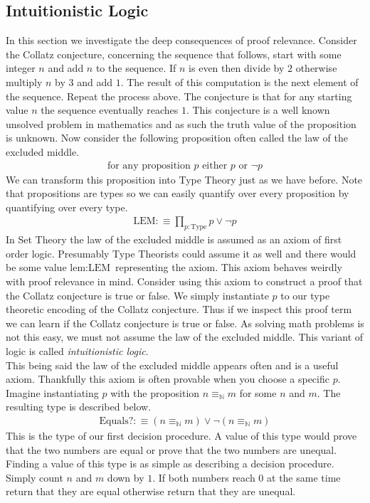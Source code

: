 \documentclass[./Thesis.tex]{subfiles}
\begin{document}
\subsection{Intuitionistic Logic}
In this section we investigate the deep consequences of proof relevance.
Consider the Collatz conjecture, concerning the sequence that follows, start with some
integer $n$ and add $n$ to the sequence. If $n$ is even then divide by $2$
otherwise multiply $n$ by $3$ and add $1$. The result of this computation is the
next element of the sequence. Repeat the process above. The conjecture is
that for any starting value $n$ the sequence eventually reaches $1$. This
conjecture is a well known unsolved problem in mathematics and as such the truth
value of the proposition is unknown. Now consider the following proposition
often called the law of the excluded middle.
\begin{align}
  \label{eqn:set-LEM}
  \text{for any proposition } p \text{ either } p \text{ or } \neg p
\end{align}
We can transform this proposition into Type Theory just as we have before. Note
that propositions are types so we can easily quantify over every proposition by
quantifying over every type.
\begin{align}
  \label{eqn:type-LEM}
  \text{LEM} :\equiv \prod_{p  : \text{Type}} p \vee \neg p
\end{align}
In Set Theory the law of the excluded middle is assumed as an axiom of first
order logic. Presumably Type Theorists could assume it as well and there would
be some value $\text{lem} : \text{LEM}$ representing the axiom. This axiom behaves weirdly
with proof relevance in mind. Consider using this axiom to construct a proof
that the Collatz conjecture is true or false. We simply instantiate $p$ to our
type theoretic encoding of the Collatz conjecture. Thus if we inspect this proof
term we can learn if the Collatz conjecture is true or false. As solving math
problems is not this easy, we must not assume the law of the excluded middle.
This variant of logic is called \textit{intuitionistic logic}. \\

This being said the law of the excluded middle appears often
and is a useful axiom. Thankfully this axiom is often provable when you choose a
specific $p$. Imagine instantiating $p$ with the proposition
$n \equiv_{\mathbb{N}} m$ for some $n$ and $m$.
The resulting type is described below.
\begin{align}
  \label{eqn:nat-dec}
  \text{Equals?} :\equiv (n \equiv_{\mathbb{N}} m) \vee \neg (n \equiv_{\mathbb{N}} m)
\end{align}
This is the type of our first decision procedure. A value of this type would
prove that the two numbers are equal or prove that the two numbers are unequal.
Finding a value of this type is as simple as describing a decision procedure.
Simply count $n$ and $m$ down by $1$. If both numbers reach $0$ at the same time
return that they are equal otherwise return that they are unequal. \\
\end{document}
